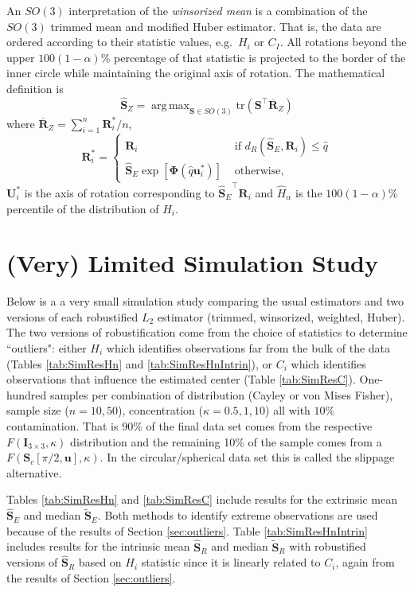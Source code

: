 \documentclass{article}\usepackage{graphicx, color}
\DeclareMathOperator*{\argmax}{arg\,max}
\newcommand{\ProjMean}{{\widehat{\bm S}_{E}}}
\newcommand{\ProjMedian}{{\widetilde{\bm S}_{E}}}
\newcommand{\GeomMean}{{\widehat{\bm S}_{R}}}
\newcommand{\GeomMedian}{{\widetilde{\bm S}_{R}}}
\newcommand{\WinzMean}{{\widehat{\bm S}_Z}}
\begin{document}
An $SO(3)$ interpretation of the \emph{winsorized mean} is a combination of the $SO(3)$ trimmed mean and modified Huber estimator.  That is, the data are ordered according to their statistic values, e.g.~$H_i$ or $C_I$.  All rotations beyond the upper $100(1-\alpha)$\% percentage of that statistic is projected to the border of the inner circle while maintaining the original axis of rotation.  The mathematical definition is 
\[
\WinzMean=\argmax_{\bm S\in SO(3)}\text{tr}(\bm S^\top\overline{\bm R}_{Z})
\]
where $\overline{\bm R}_{Z}=\sum_{i=1}^n\bm R_i^*/n$, 
\[
\bm R_i^*=
\begin{cases}
\bm R_i&\text{ if }d_R(\ProjMean,\bm R_i)\leq\hat{q}\\
\ProjMean\exp[\bm{\Phi}(\hat{q}\bm{u}_i^*)]&\text{ otherwise,}
\end{cases}
\]
$\bm U_i^*$ is the axis of rotation corresponding to $\ProjMean^\top\bm R_i$ and $\hat{H}_\alpha$ is the $100(1-\alpha)$\% percentile of the distribution of $H_i$.




\section{(Very) Limited Simulation Study}

Below is a a very small simulation study comparing the usual estimators and two versions of each robustified $L_2$ estimator (trimmed, winsorized, weighted, Huber).  The two versions of robustification come from the choice of statistics to determine ``outliers": either $H_i$ which identifies observations far from the bulk of the data (Tables \ref{tab:SimResHn} and \ref{tab:SimResHnIntrin}), or $C_i$ which identifies observations that influence the estimated center (Table \ref{tab:SimResC}).  One-hundred samples per combination of distribution (Cayley or von Mises Fisher), sample size ($n=10,50$), concentration ($\kappa=0.5,1,10$) all with $10\%$ contamination.  That is 90\% of the final data set comes from the respective $F(\bm I_{3\times 3},\kappa)$ distribution and the remaining 10\% of the sample comes from a $F(\bm S_c[\pi/2,\bm u],\kappa)$.  In the circular/spherical data set this is called the slippage alternative.  

Tables \ref{tab:SimResHn} and \ref{tab:SimResC} include results for the extrinsic mean $\ProjMean$ and median $\ProjMedian$. Both methods to identify extreme observations are used because of the results of Section \ref{sec:outliers}.  Table \ref{tab:SimResHnIntrin} includes results for the intrinsic mean $\GeomMean$ and median $\GeomMedian$ with robustified versions of $\GeomMean$ based on $H_i$ statistic since it is linearly related to $C_i$, again from the results of Section \ref{sec:outliers}.
\end{document}
